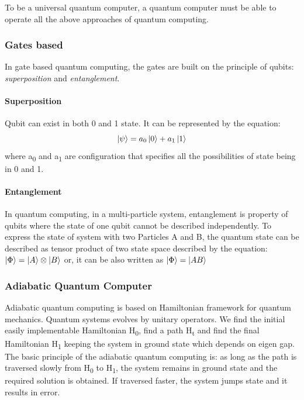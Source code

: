 \documentclass[12pt,conference]{IEEEtran}
\begin{document}
To be a universal quantum computer, a quantum computer must be able to operate all the above approaches of quantum computing.



\subsubsection{Gates based}
In gate based quantum computing, the gates are built on the principle of qubits: \emph{superposition} and \emph{entanglement}.

\paragraph{Superposition}
Qubit can exist in both 0 and 1 state. It can be represented by the equation:
\begin{equation*}
  \ket {\psi} = a_0 \ket{0} + a_1 \ket{1}
\end{equation*} 
where a\textsubscript{0} and a\textsubscript{1} are configuration that specifies all the possibilities of state being in 0 and 1.\cite{1}

\paragraph{Entanglement}
In quantum computing, in a multi-particle system, entanglement is property of qubits where the state of one qubit cannot be described independently. To express the state of system with two Particles A and B, the quantum state can be described as tensor product of two state space described by the equation:
$\ket {\Phi} = \ket{A} \otimes \ket{B}$
or, it can be also written as
$\ket {\Phi} = \ket{AB}$


\subsubsection{Adiabatic Quantum Computer}
Adiabatic quantum computing is based on Hamiltonian framework for quantum mechanics. Quantum systems evolves by unitary operators. We find the initial easily implementable Hamiltonian H\textsubscript{0}, find a path H\textsubscript{t} and find the final Hamiltonian H\textsubscript{1} keeping the system in ground state which depends on eigen gap. The basic principle of the adiabatic quantum computing is: as long as the path is traversed slowly from H\textsubscript{0} to H\textsubscript{1}, the system remains in ground state and the required solution is obtained. If traversed faster, the system jumps state and it results in error.
\end{document}
